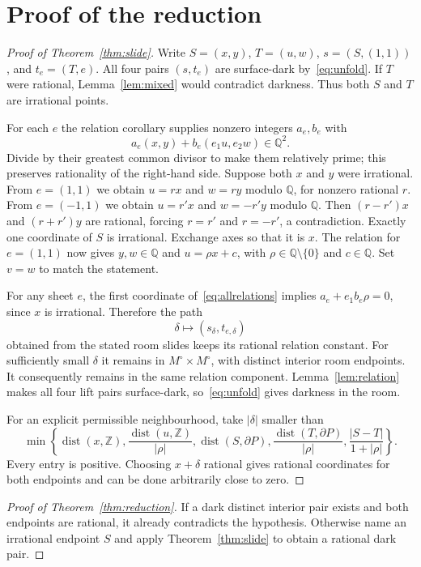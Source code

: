 \documentclass[11pt]{article}
\theoremstyle{remark}
\newcommand{\Q}{\mathbb Q}
\newcommand{\Z}{\mathbb Z}
\begin{document}
\section{Proof of the reduction}
\begin{proof}[Proof of Theorem~\ref{thm:slide}]
Write $S=(x,y)$, $T=(u,w)$, $s=(S,(1,1))$, and $t_e=(T,e)$.
All four pairs $(s,t_e)$ are surface-dark by~\eqref{eq:unfold}.
If $T$ were rational, Lemma~\ref{lem:mixed} would contradict darkness.
Thus both $S$ and $T$ are irrational points.

For each $e$ the relation corollary supplies nonzero integers $a_e,b_e$ with
\begin{equation}\label{eq:allrelations}
 a_e(x,y)+b_e(e_1u,e_2w)\in\Q^2.
\end{equation}
Divide by their greatest common divisor to make them relatively prime;
this preserves rationality of the right-hand side.
Suppose both $x$ and $y$ were irrational. From $e=(1,1)$ we obtain
$u=r x$ and $w=r y$ modulo $\Q$, for nonzero rational $r$.
From $e=(-1,1)$ we obtain $u=r'x$ and $w=-r'y$ modulo $\Q$.
Then $(r-r')x$ and $(r+r')y$ are rational, forcing $r=r'$ and $r=-r'$,
a contradiction. Exactly one coordinate of $S$ is irrational.
Exchange axes so that it is $x$.
The relation for $e=(1,1)$ now gives $y,w\in\Q$ and
$u=\rho x+c$, with $\rho\in\Q\setminus\{0\}$ and $c\in\Q$.
Set $v=w$ to match the statement.

For any sheet $e$, the first coordinate of~\eqref{eq:allrelations} implies
$a_e+e_1b_e\rho=0$, since $x$ is irrational. Therefore the path
\[
 \delta\longmapsto(s_\delta,t_{e,\delta})
\]
obtained from the stated room slides keeps its rational relation constant.
For sufficiently small $\delta$ it remains in $M^\circ\times M^\circ$,
with distinct interior room endpoints. It consequently remains in the
same relation component. Lemma~\ref{lem:relation} makes all four lift pairs
surface-dark, so~\eqref{eq:unfold} gives darkness in the room.

For an explicit permissible neighbourhood, take $|\delta|$ smaller than
\[
 \min\left\{\operatorname{dist}(x,\Z),
 \frac{\operatorname{dist}(u,\Z)}{|\rho|},
 \operatorname{dist}(S,\partial P),
 \frac{\operatorname{dist}(T,\partial P)}{|\rho|},
 \frac{|S-T|}{1+|\rho|}\right\}.
\]
Every entry is positive. Choosing $x+\delta$ rational gives rational
coordinates for both endpoints and can be done arbitrarily close to zero.
\end{proof}

\begin{proof}[Proof of Theorem~\ref{thm:reduction}]
If a dark distinct interior pair exists and both endpoints are rational,
it already contradicts the hypothesis. Otherwise name an irrational
endpoint $S$ and apply Theorem~\ref{thm:slide} to obtain a rational dark pair.
\end{proof}
\end{document}
